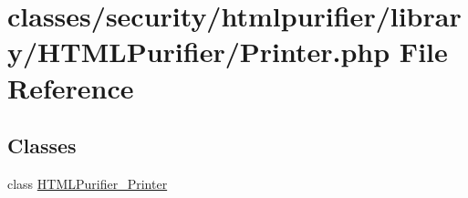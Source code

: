 \hypertarget{Printer_8php}{\section{classes/security/htmlpurifier/library/\+H\+T\+M\+L\+Purifier/\+Printer.php File Reference}
\label{Printer_8php}
}
\subsection*{Classes}
\begin{DoxyCompactItemize}
\item 
class \hyperlink{classHTMLPurifier__Printer}{H\+T\+M\+L\+Purifier\+\_\+\+Printer}
\end{DoxyCompactItemize}
